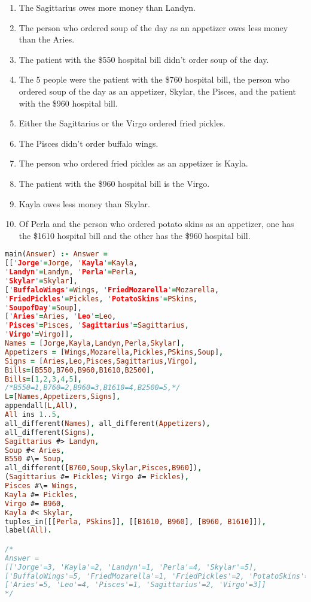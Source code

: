 \documentclass[fontsize=10pt]{slnotes}
\begin{document}
\begin{enumerate}
\item The Sagittarius owes more money than Landyn.
\item The person who ordered soup of the day as an appetizer owes less money than the Aries.
\item The patient with the \$550 hospital bill didn't order soup of the day.
\item The 5 people were the patient with the \$760 hospital bill, the person who ordered soup of the day as an appetizer, Skylar, the Pisces, and the patient with the \$960 hospital bill.
\item Either the Sagittarius or the Virgo ordered fried pickles.
\item The Pisces didn't order buffalo wings.
\item The person who ordered fried pickles as an appetizer is Kayla.
\item The patient with the \$960 hospital bill is the Virgo.
\item Kayla owes less money than Skylar.
\item Of Perla and the person who ordered potato skins as an appetizer, one has the \$1610 hospital bill and the other has the \$960 hospital bill.
\end{enumerate}

\begin{lstlisting}[language=Prolog]
main(Answer) :- Answer =
[['Jorge'=Jorge, 'Kayla'=Kayla,
'Landyn'=Landyn, 'Perla'=Perla,
'Skylar'=Skylar],
['BuffaloWings'=Wings, 'FriedMozarella'=Mozarella,
'FriedPickles'=Pickles, 'PotatoSkins'=PSkins,
'SoupofDay'=Soup],
['Aries'=Aries, 'Leo'=Leo,
'Pisces'=Pisces, 'Sagittarius'=Sagittarius,
'Virgo'=Virgo]],
Names = [Jorge,Kayla,Landyn,Perla,Skylar],
Appetizers = [Wings,Mozarella,Pickles,PSkins,Soup],
Signs = [Aries,Leo,Pisces,Sagittarius,Virgo],
Bills=[B550,B760,B960,B1610,B2500],
Bills=[1,2,3,4,5],
/*B550=1,B760=2,B960=3,B1610=4,B2500=5,*/
L=[Names,Appetizers,Signs],
appendall(L,All),
All ins 1..5,
all_different(Names), all_different(Appetizers),
all_different(Signs),
Sagittarius #> Landyn,
Soup #< Aries,
B550 #\= Soup,
all_different([B760,Soup,Skylar,Pisces,B960]),
(Sagittarius #= Pickles; Virgo #= Pickles),
Pisces #\= Wings,
Kayla #= Pickles,
Virgo #= B960,
Kayla #< Skylar,
tuples_in([[Perla, PSkins]], [[B1610, B960], [B960, B1610]]),
label(All).

/*
Answer =
[['Jorge'=3, 'Kayla'=2, 'Landyn'=1, 'Perla'=4, 'Skylar'=5],
['BuffaloWings'=5, 'FriedMozarella'=1, 'FriedPickles'=2, 'PotatoSkins'=3, 'SoupofDay'=4],
['Aries'=5, 'Leo'=4, 'Pisces'=1, 'Sagittarius'=2, 'Virgo'=3]]
*/
\end{lstlisting}
\end{document}
